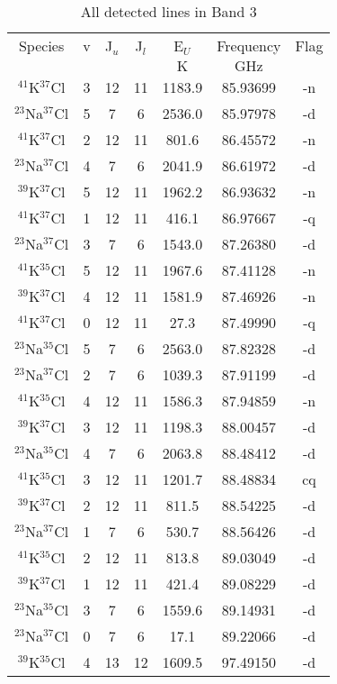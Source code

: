 \begin{table*}[htp]
\centering
\caption{All detected lines in Band 3}
\begin{tabular}{ccccccc}
\label{tab:all_detections_B3}
Species & v & J$_u$ & J$_l$ & E$_U$ & Frequency & Flag \\
 &  &  &  & $\mathrm{K}$ & $\mathrm{GHz}$ &  \\
\hline
$^{41}$K$^{37}$Cl & 3 & 12 & 11 & 1183.9 & 85.93699 & -n \\
$^{23}$Na$^{37}$Cl & 5 & 7 & 6 & 2536.0 & 85.97978 & -d \\
$^{41}$K$^{37}$Cl & 2 & 12 & 11 & 801.6 & 86.45572 & -n \\
$^{23}$Na$^{37}$Cl & 4 & 7 & 6 & 2041.9 & 86.61972 & -d \\
$^{39}$K$^{37}$Cl & 5 & 12 & 11 & 1962.2 & 86.93632 & -n \\
$^{41}$K$^{37}$Cl & 1 & 12 & 11 & 416.1 & 86.97667 & -q \\
$^{23}$Na$^{37}$Cl & 3 & 7 & 6 & 1543.0 & 87.26380 & -d \\
$^{41}$K$^{35}$Cl & 5 & 12 & 11 & 1967.6 & 87.41128 & -n \\
$^{39}$K$^{37}$Cl & 4 & 12 & 11 & 1581.9 & 87.46926 & -n \\
$^{41}$K$^{37}$Cl & 0 & 12 & 11 & 27.3 & 87.49990 & -q \\
$^{23}$Na$^{35}$Cl & 5 & 7 & 6 & 2563.0 & 87.82328 & -d \\
$^{23}$Na$^{37}$Cl & 2 & 7 & 6 & 1039.3 & 87.91199 & -d \\
$^{41}$K$^{35}$Cl & 4 & 12 & 11 & 1586.3 & 87.94859 & -n \\
$^{39}$K$^{37}$Cl & 3 & 12 & 11 & 1198.3 & 88.00457 & -d \\
$^{23}$Na$^{35}$Cl & 4 & 7 & 6 & 2063.8 & 88.48412 & -d \\
$^{41}$K$^{35}$Cl & 3 & 12 & 11 & 1201.7 & 88.48834 & cq \\
$^{39}$K$^{37}$Cl & 2 & 12 & 11 & 811.5 & 88.54225 & -d \\
$^{23}$Na$^{37}$Cl & 1 & 7 & 6 & 530.7 & 88.56426 & -d \\
$^{41}$K$^{35}$Cl & 2 & 12 & 11 & 813.8 & 89.03049 & -d \\
$^{39}$K$^{37}$Cl & 1 & 12 & 11 & 421.4 & 89.08229 & -d \\
$^{23}$Na$^{35}$Cl & 3 & 7 & 6 & 1559.6 & 89.14931 & -d \\
$^{23}$Na$^{37}$Cl & 0 & 7 & 6 & 17.1 & 89.22066 & -d \\
$^{39}$K$^{35}$Cl & 4 & 13 & 12 & 1609.5 & 97.49150 & -d \\

\end{tabular}
\end{table*}

